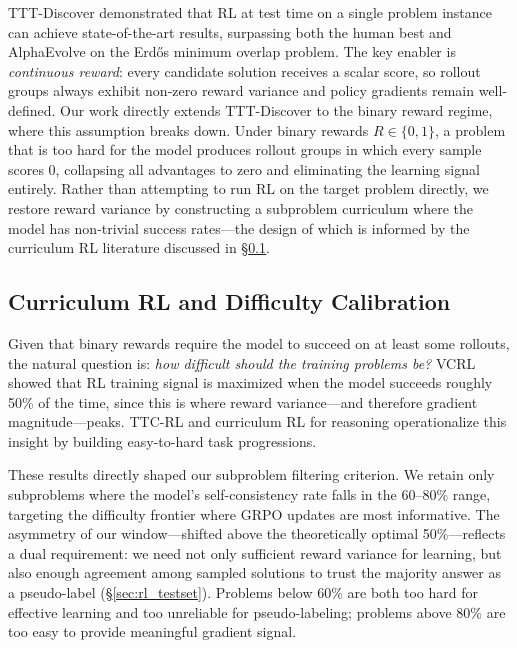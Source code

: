 \documentclass{article}
\begin{document}
TTT-Discover \cite{tttdiscover} demonstrated that RL at test time on a single problem instance can achieve state-of-the-art results, surpassing both the human best and AlphaEvolve on the Erd\H{o}s minimum overlap problem. The key enabler is \textit{continuous reward}: every candidate solution receives a scalar score, so rollout groups always exhibit non-zero reward variance and policy gradients remain well-defined. Our work directly extends TTT-Discover to the binary reward regime, where this assumption breaks down. Under binary rewards $R \in \{0, 1\}$, a problem that is too hard for the model produces rollout groups in which every sample scores 0, collapsing all advantages to zero and eliminating the learning signal entirely. Rather than attempting to run RL on the target problem directly, we restore reward variance by constructing a subproblem curriculum where the model has non-trivial success rates—the design of which is informed by the curriculum RL literature discussed in \S\ref{sec:curriculum}.

\subsection{Curriculum RL and Difficulty Calibration}
\label{sec:curriculum}

Given that binary rewards require the model to succeed on at least some rollouts, the natural question is: \textit{how difficult should the training problems be?} VCRL \cite{vcrl} showed that RL training signal is maximized when the model succeeds roughly 50\% of the time, since this is where reward variance—and therefore gradient magnitude—peaks. TTC-RL \cite{tticrl} and curriculum RL for reasoning \cite{curriculumrl} operationalize this insight by building easy-to-hard task progressions.

These results directly shaped our subproblem filtering criterion. We retain only subproblems where the model's self-consistency rate falls in the 60--80\% range, targeting the difficulty frontier where GRPO \cite{deepseekmath} updates are most informative. The asymmetry of our window—shifted above the theoretically optimal 50\%---reflects a dual requirement: we need not only sufficient reward variance for learning, but also enough agreement among sampled solutions to trust the majority answer as a pseudo-label (\S\ref{sec:rl_testset}). Problems below 60\% are both too hard for effective learning and too unreliable for pseudo-labeling; problems above 80\% are too easy to provide meaningful gradient signal.
\end{document}
